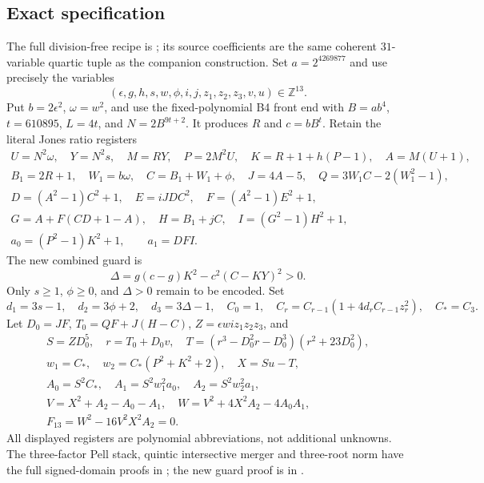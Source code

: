\subsection*{Exact specification}
The full division-free recipe is
; its source coefficients
are the same coherent $31$-variable quartic tuple as the companion
construction.  Set $a=2^{4269877}$ and use precisely the variables
\[
 (\epsilon,g,h,s,w,\phi,i,j,z_1,z_2,z_3,v,u)\in\mathbb Z^{13}.
\]
Put $b=2\epsilon^2$, $\omega=w^2$, and use the fixed-polynomial B4 front end
with $B=ab^4$, $t=610895$, $L=4t$, and $N=2B^{9t+2}$.  It produces $R$ and
\(c=bB^t\).  Retain the literal Jones ratio registers
\[
\begin{gathered}
 U=N^2\omega,\quad Y=N^2s,\quad M=RY,\quad P=2M^2U,\quad
 K=R+1+h(P-1),\quad A=M(U+1),\\
 B_1=2R+1,\quad W_1=b\omega,\quad C=B_1+W_1+\phi,
 \quad J=4A-5,\quad Q=3W_1C-2(W_1^2-1),\\
 D=(A^2-1)C^2+1,\quad E=iJDC^2,\quad F=(A^2-1)E^2+1,\\
 G=A+F(CD+1-A),\quad H=B_1+jC,\quad I=(G^2-1)H^2+1,\\
 a_0=(P^2-1)K^2+1,\qquad a_1=DFI.
\end{gathered}
\]
The new combined guard is
\[
 \boxed{\Delta=g(c-g)K^2-c^2(C-KY)^2>0.}
\]
Only $s\ge1$, $\phi\ge0$, and $\Delta>0$ remain to be encoded.  Set
\[
 d_1=3s-1,\quad d_2=3\phi+2,\quad d_3=3\Delta-1,
 \quad C_0=1,\quad C_r=C_{r-1}(1+4d_rC_{r-1}z_r^2),
 \quad C_*=C_3.
\]
Let $D_0=JF$, $T_0=QF+J(H-C)$, $Z=\epsilon wi z_1z_2z_3$, and
\[
\begin{gathered}
 S=ZD_0^5,\quad r=T_0+D_0v,\quad
 T=(r^3-D_0^2r-D_0^3)(r^2+23D_0^2),\\
 w_1=C_*,\quad w_2=C_*(P^2+K^2+2),\quad X=Su-T,\\
 A_0=S^2C_*,\quad A_1=S^2w_1^2a_0,\quad A_2=S^2w_2^2a_1,\\
 V=X^2+A_2-A_0-A_1,\quad W=V^2+4X^2A_2-4A_0A_1,\\
 \boxed{F_{13}=W^2-16V^2X^2A_2=0.}
\end{gathered}
\]
All displayed registers are polynomial abbreviations, not additional
unknowns.  The three-factor Pell stack, quintic intersective merger and
three-root norm have the full signed-domain proofs in
; the new guard proof is in
.

